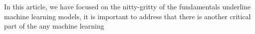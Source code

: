 In this article, we have focused on the nitty-gritty of the fundamentals underline machine learning models, it is important to address that there is another critical part of the any machine learning 